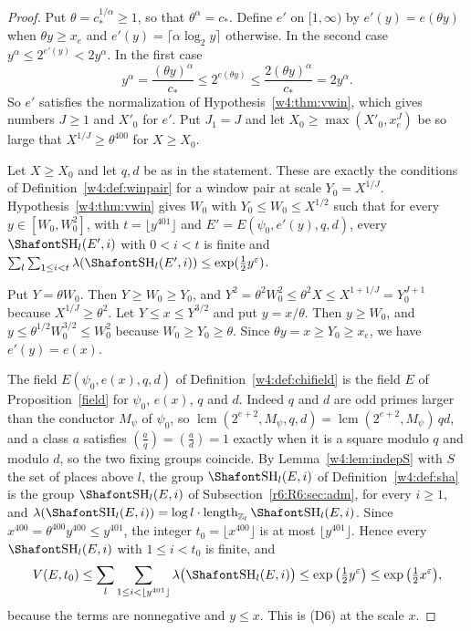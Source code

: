 \begin{proof}
Put $\theta=c_\ast^{1/\alpha}\ge1$, so that $\theta^\alpha=c_\ast$. Define $e'$ on $[1,\infty)$ by $e'(y)=e(\theta y)$ when $\theta y\ge x_e$ and $e'(y)=\lceil\alpha\log_2y\rceil$ otherwise. In the second case $y^\alpha\le2^{e'(y)}<2y^\alpha$. In the first case
\[
y^\alpha=\frac{(\theta y)^\alpha}{c_\ast}\le2^{e(\theta y)}\le\frac{2(\theta y)^\alpha}{c_\ast}=2y^\alpha .
\]
So $e'$ satisfies the normalization of Hypothesis~\ref{w4:thm:vwin}, which gives numbers $J\ge1$ and $X'_0$ for $e'$. Put $J_1=J$ and let $X_0\ge\max(X'_0,x_e^{J})$ be so large that $X^{1/J}\ge\theta^{400}$ for $X\ge X_0$.

Let $X\ge X_0$ and let $q,d$ be as in the statement. These are exactly the conditions of Definition~\ref{w4:def:winpair} for a window pair at scale $Y_0=X^{1/J}$. Hypothesis~\ref{w4:thm:vwin} gives $W_0$ with $Y_0\le W_0\le X^{1/2}$ such that for every $y\in[W_0,W_0^2]$, with $t=\lfloor y^{401}\rfloor$ and $E'=E(\psi_0,e'(y),q,d)$, every $\Sha_l(E',i)$ with $0<i<t$ is finite and $\sum_l\sum_{1\le i<t}\lambda(\Sha_l(E',i))\le\exp(\frac12y^\varepsilon)$.

Put $Y=\theta W_0$. Then $Y\ge W_0\ge Y_0$, and $Y^2=\theta^2W_0^2\le\theta^2X\le X^{1+1/J}=Y_0^{J+1}$ because $X^{1/J}\ge\theta^2$. Let $Y\le x\le Y^{3/2}$ and put $y=x/\theta$. Then $y\ge W_0$, and $y\le\theta^{1/2}W_0^{3/2}\le W_0^2$ because $W_0\ge Y_0\ge\theta$. Since $\theta y=x\ge Y_0\ge x_e$, we have $e'(y)=e(x)$.

The field $E(\psi_0,e(x),q,d)$ of Definition~\ref{w4:def:chifield} is the field $E$ of Proposition~\ref{field} for $\psi_0$, $e(x)$, $q$ and $d$. Indeed $q$ and $d$ are odd primes larger than the conductor $M_\psi$ of $\psi_0$, so $\operatorname{lcm}(2^{e+2},M_\psi,q,d)=\operatorname{lcm}(2^{e+2},M_\psi)\,qd$, and a class $a$ satisfies $(\frac aq)=(\frac ad)=1$ exactly when it is a square modulo $q$ and modulo $d$, so the two fixing groups coincide. By Lemma~\ref{w4:lem:indepS} with $S$ the set of places above $l$, the group $\Sha_l(E,i)$ of Definition~\ref{w4:def:sha} is the group $\Sha_l(E,i)$ of Subsection~\ref{r6:R6:sec:adm}, for every $i\ge1$, and $\lambda(\Sha_l(E,i))=\log l\cdot\operatorname{length}_{\mathbb Z_l}\Sha_l(E,i)$. Since $x^{400}=\theta^{400}y^{400}\le y^{401}$, the integer $t_0=\lfloor x^{400}\rfloor$ is at most $\lfloor y^{401}\rfloor$. Hence every $\Sha_l(E,i)$ with $1\le i<t_0$ is finite, and
\[
V(E,t_0)\le\sum_l\sum_{1\le i<\lfloor y^{401}\rfloor}\lambda\big(\Sha_l(E,i)\big)\le\exp\big(\tfrac12y^\varepsilon\big)\le\exp\big(\tfrac12x^\varepsilon\big),
\]
because the terms are nonnegative and $y\le x$. This is (D6) at the scale $x$.
\end{proof}

